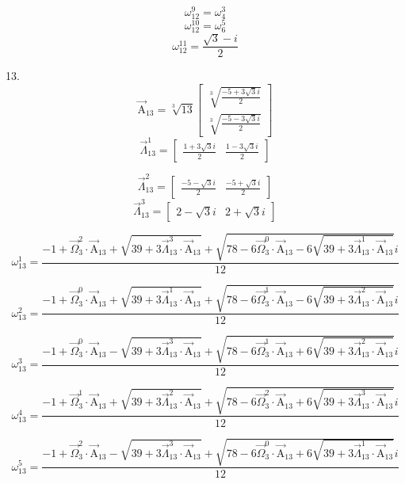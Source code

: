 \documentclass{article}
\begin{document}
\[ \omega_{12}^{9}=\omega_{4}^{3} \]
\[ \omega_{12}^{10}=\omega_{6}^{5} \]
\[ \omega_{12}^{11}=\frac{\sqrt{3}-i}{2} \]

13.
\[ \vec{\mathrm{A}}_{13}=\sqrt[3]{13}\left[ \begin{matrix} \sqrt[3]{\frac{-5+3\sqrt{3}i}{2}} \\ \sqrt[3]{\frac{-5-3\sqrt{3}i}{2}} \end{matrix} \right] \]
\[ \vec{\Lambda}_{13}^{1}=\left[ \begin{matrix} \frac{1+3\sqrt{3}i}{2} & \frac{1-3\sqrt{3}i}{2} \end{matrix} \right] \]

\[ \vec{\Lambda}_{13}^{2}=\left[ \begin{matrix} \frac{-5-\sqrt{3}i}{2} & \frac{-5+\sqrt{3}i}{2} \end{matrix} \right] \]
\[ \vec{\Lambda}_{13}^{3}=\left[ \begin{matrix} 2-\sqrt{3}i & 2+\sqrt{3}i \end{matrix} \right] \]

\[ \omega_{13}^{1}=\frac{-1+\vec{\Omega}_{3}^{2}\cdot\vec{\mathrm{A}}_{13}+\sqrt{39+3\vec{\Lambda}_{13}^{3}\cdot\vec{\mathrm{A}}_{13}}+\sqrt{78-6\vec{\Omega}_{3}^{0}\cdot\vec{\mathrm{A}}_{13}-6\sqrt{39+3\vec{\Lambda}_{13}^{1}\cdot\vec{\mathrm{A}}_{13}}}i}{12} \]

\[ \omega_{13}^{2}=\frac{-1+\vec{\Omega}_{3}^{0}\cdot\vec{\mathrm{A}}_{13}+\sqrt{39+3\vec{\Lambda}_{13}^{1}\cdot\vec{\mathrm{A}}_{13}}+\sqrt{78-6\vec{\Omega}_{3}^{1}\cdot\vec{\mathrm{A}}_{13}-6\sqrt{39+3\vec{\Lambda}_{13}^{2}\cdot\vec{\mathrm{A}}_{13}}}i}{12} \]

\[ \omega_{13}^{3}=\frac{-1+\vec{\Omega}_{3}^{0}\cdot\vec{\mathrm{A}}_{13}-\sqrt{39+3\vec{\Lambda}_{13}^{3}\cdot\vec{\mathrm{A}}_{13}}+\sqrt{78-6\vec{\Omega}_{3}^{1}\cdot\vec{\mathrm{A}}_{13}+6\sqrt{39+3\vec{\Lambda}_{13}^{2}\cdot\vec{\mathrm{A}}_{13}}}i}{12} \]

\[ \omega_{13}^{4}=\frac{-1+\vec{\Omega}_{3}^{1}\cdot\vec{\mathrm{A}}_{13}+\sqrt{39+3\vec{\Lambda}_{13}^{2}\cdot\vec{\mathrm{A}}_{13}}+\sqrt{78-6\vec{\Omega}_{3}^{2}\cdot\vec{\mathrm{A}}_{13}+6\sqrt{39+3\vec{\Lambda}_{13}^{3}\cdot\vec{\mathrm{A}}_{13}}}i}{12} \]

\[ \omega_{13}^{5}=\frac{-1+\vec{\Omega}_{3}^{2}\cdot\vec{\mathrm{A}}_{13}-\sqrt{39+3\vec{\Lambda}_{13}^{3}\cdot\vec{\mathrm{A}}_{13}}+\sqrt{78-6\vec{\Omega}_{3}^{0}\cdot\vec{\mathrm{A}}_{13}+6\sqrt{39+3\vec{\Lambda}_{13}^{1}\cdot\vec{\mathrm{A}}_{13}}}i}{12} \]
\end{document}
